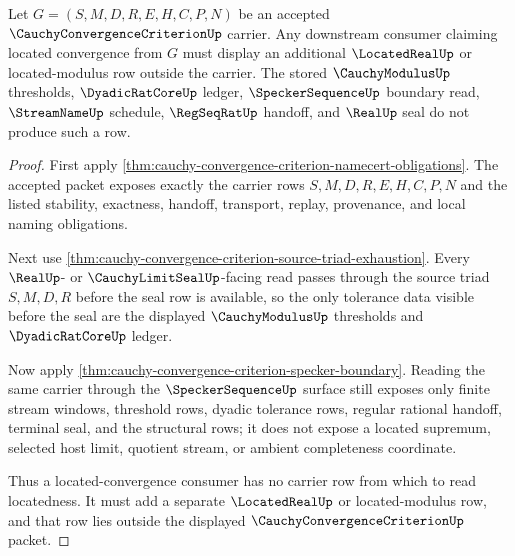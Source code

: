 \begin{theorem}
\label{thm:cauchy-convergence-criterion-located-modulus-frontier}
Let $G=(S,M,D,R,E,H,C,P,N)$ be an accepted $\CauchyConvergenceCriterionUp$ carrier. Any downstream consumer claiming located convergence from $G$ must display an additional $\LocatedRealUp$ or located-modulus row outside the carrier. The stored $\CauchyModulusUp$ thresholds, $\DyadicRatCoreUp$ ledger, $\SpeckerSequenceUp$ boundary read, $\StreamNameUp$ schedule, $\RegSeqRatUp$ handoff, and $\RealUp$ seal do not produce such a row.
\end{theorem}
\begin{proof}
First apply \autoref{thm:cauchy-convergence-criterion-namecert-obligations}. The accepted packet exposes exactly the carrier rows $S,M,D,R,E,H,C,P,N$ and the listed stability, exactness, handoff, transport, replay, provenance, and local naming obligations.

Next use \autoref{thm:cauchy-convergence-criterion-source-triad-exhaustion}. Every $\RealUp$- or $\CauchyLimitSealUp$-facing read passes through the source triad $S,M,D,R$ before the seal row is available, so the only tolerance data visible before the seal are the displayed $\CauchyModulusUp$ thresholds and $\DyadicRatCoreUp$ ledger.

Now apply \autoref{thm:cauchy-convergence-criterion-specker-boundary}. Reading the same carrier through the $\SpeckerSequenceUp$ surface still exposes only finite stream windows, threshold rows, dyadic tolerance rows, regular rational handoff, terminal seal, and the structural rows; it does not expose a located supremum, selected host limit, quotient stream, or ambient completeness coordinate.

Thus a located-convergence consumer has no carrier row from which to read locatedness. It must add a separate $\LocatedRealUp$ or located-modulus row, and that row lies outside the displayed $\CauchyConvergenceCriterionUp$ packet.
\end{proof}

